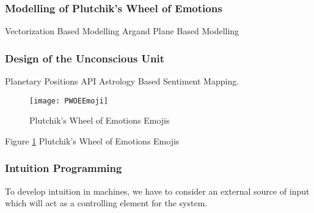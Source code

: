 \subsubsection{Modelling of Plutchik’s Wheel of Emotions}
Vectorization Based Modelling Argand Plane Based Modelling

\subsubsection{Design of the Unconscious Unit}
Planetary Positions API Astrology Based Sentiment Mapping.
\begin{figure}[H]
	\texttt{[image: PWOEEmoji]}
	\caption{Plutchik’s Wheel of Emotions Emojis}
	\label{Fig:fig2}
\end{figure}
Figure \ref{Fig:fig2} Plutchik’s Wheel of Emotions Emojis

\subsubsection{Intuition Programming}
To develop intuition in machines, we have to consider an external source of input which will act as a controlling element for the system.
